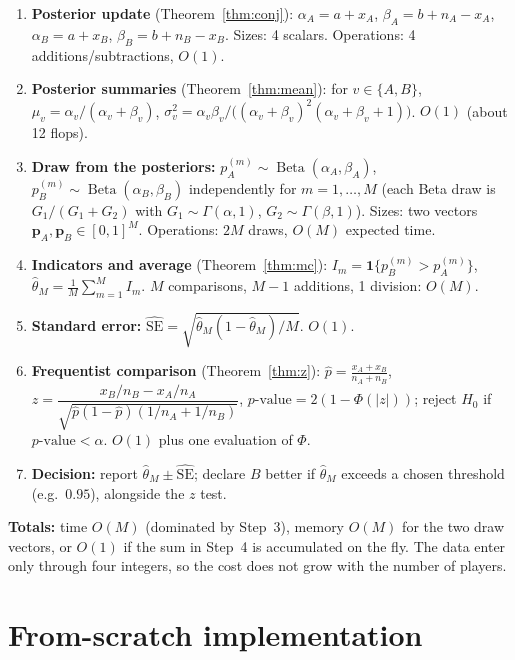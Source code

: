 \documentclass[11pt]{article}
\theoremstyle{definition}
\theoremstyle{remark}
\newcommand{\Betad}{\operatorname{Beta}}
\newcommand{\ind}[1]{\mathbf{1}\{#1\}}
\begin{document}
\begin{enumerate}[leftmargin=*]
\item \textbf{Posterior update} (Theorem~\ref{thm:conj}):
  $\alpha_A=a+x_A$, $\beta_A=b+n_A-x_A$, $\alpha_B=a+x_B$, $\beta_B=b+n_B-x_B$.
  \hfill Sizes: 4 scalars. Operations: 4 additions/subtractions, $O(1)$.
\item \textbf{Posterior summaries} (Theorem~\ref{thm:mean}): for $v\in\{A,B\}$,
  $\mu_v=\alpha_v/(\alpha_v+\beta_v)$, $\sigma_v^2=\alpha_v\beta_v/\big((\alpha_v+\beta_v)^2(\alpha_v+\beta_v+1)\big)$.
  \hfill $O(1)$ (about 12 flops).
\item \textbf{Draw from the posteriors:} $p_A^{(m)}\sim\Betad(\alpha_A,\beta_A)$,
  $p_B^{(m)}\sim\Betad(\alpha_B,\beta_B)$ independently for $m=1,\dots,M$
  (each Beta draw is $G_1/(G_1+G_2)$ with $G_1\sim\Gamma(\alpha,1)$, $G_2\sim\Gamma(\beta,1)$).
  \hfill Sizes: two vectors $\mathbf p_A,\mathbf p_B\in[0,1]^M$. Operations: $2M$ draws, $O(M)$ expected time.
\item \textbf{Indicators and average} (Theorem~\ref{thm:mc}):
  $I_m=\ind{p_B^{(m)}>p_A^{(m)}}$, $\hat\theta_M=\frac1M\sum_{m=1}^M I_m$.
  \hfill $M$ comparisons, $M-1$ additions, 1 division: $O(M)$.
\item \textbf{Standard error:} $\widehat{\mathrm{SE}}=\sqrt{\hat\theta_M(1-\hat\theta_M)/M}$.
  \hfill $O(1)$.
\item \textbf{Frequentist comparison} (Theorem~\ref{thm:z}):
  $\hat p=\frac{x_A+x_B}{n_A+n_B}$,
  $z=\dfrac{x_B/n_B-x_A/n_A}{\sqrt{\hat p(1-\hat p)(1/n_A+1/n_B)}}$,
  $p\text{-value}=2(1-\Phi(|z|))$; reject $H_0$ if $p\text{-value}<\alpha$.
  \hfill $O(1)$ plus one evaluation of $\Phi$.
\item \textbf{Decision:} report $\hat\theta_M\pm\widehat{\mathrm{SE}}$; declare $B$ better if $\hat\theta_M$ exceeds a
  chosen threshold (e.g.\ $0.95$), alongside the $z$ test.
\end{enumerate}
\noindent\textbf{Totals:} time $O(M)$ (dominated by Step~3), memory $O(M)$ for the two draw vectors, or $O(1)$ if the
sum in Step~4 is accumulated on the fly. The data enter only through four integers, so the cost does not grow with
the number of players.

\section{From-scratch implementation}\label{sec:impl}
\end{document}

